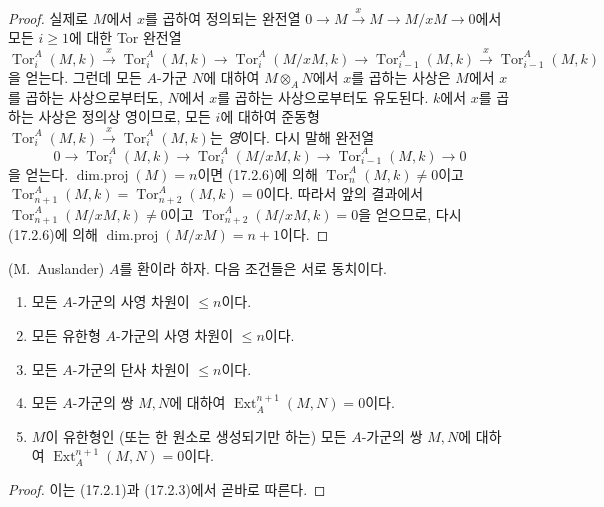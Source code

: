 \begin{proof}
실제로 $M$에서 $x$를 곱하여 정의되는 완전열
$0\longrightarrow M\xrightarrow{x}M\longrightarrow M/xM
\longrightarrow0$에서 모든 $i\geq1$에 대한 Tor 완전열
\[
  \operatorname{Tor}^A_i(M,k)\xrightarrow{x}
  \operatorname{Tor}^A_i(M,k)\longrightarrow
  \operatorname{Tor}^A_i(M/xM,k)\longrightarrow
  \operatorname{Tor}^A_{i-1}(M,k)\xrightarrow{x}
  \operatorname{Tor}^A_{i-1}(M,k)
\]
을 얻는다. 그런데 모든 $A$-가군 $N$에 대하여 $M\otimes_A N$에서
$x$를 곱하는 사상은 $M$에서 $x$를 곱하는 사상으로부터도, $N$에서
$x$를 곱하는 사상으로부터도 유도된다. $k$에서 $x$를 곱하는 사상은
정의상 영이므로, 모든 $i$에 대하여 준동형
$\operatorname{Tor}^A_i(M,k)\xrightarrow{x}
\operatorname{Tor}^A_i(M,k)$는 \emph{영}이다. 다시 말해 완전열
\[
  0\longrightarrow\operatorname{Tor}^A_i(M,k)\longrightarrow
  \operatorname{Tor}^A_i(M/xM,k)\longrightarrow
  \operatorname{Tor}^A_{i-1}(M,k)\longrightarrow0
\]
을 얻는다. $\operatorname{dim.proj}(M)=n$이면 (17.2.6)에 의해
$\operatorname{Tor}^A_n(M,k)\neq0$이고
$\operatorname{Tor}^A_{n+1}(M,k)=
\operatorname{Tor}^A_{n+2}(M,k)=0$이다. 따라서 앞의 결과에서
$\operatorname{Tor}^A_{n+1}(M/xM,k)\neq0$이고
$\operatorname{Tor}^A_{n+2}(M/xM,k)=0$을 얻으므로, 다시 (17.2.6)에
의해 $\operatorname{dim.proj}(M/xM)=n+1$이다.
\end{proof}

\begin{proposition}[17.2.8]
\label{0.17.2.8-fr}
\textnormal{(M.~Auslander)} $A$를 환이라 하자. 다음 조건들은 서로
동치이다.
\begin{enumerate}
  \item[\rm a)] 모든 $A$-가군의 사영 차원이 $\leq n$이다.
  \item[\rm a')] 모든 유한형 $A$-가군의 사영 차원이 $\leq n$이다.
  \item[\rm b)] 모든 $A$-가군의 단사 차원이 $\leq n$이다.
  \item[\rm c)] 모든 $A$-가군의 쌍 $M,N$에 대하여
  $\operatorname{Ext}^{n+1}_A(M,N)=0$이다.
  \item[\rm c')] $M$이 유한형인 (또는 한 원소로 생성되기만 하는)
  모든 $A$-가군의 쌍 $M,N$에 대하여
  $\operatorname{Ext}^{n+1}_A(M,N)=0$이다.
\end{enumerate}
\end{proposition}

\begin{proof}
이는 (17.2.1)과 (17.2.3)에서 곧바로 따른다.
\end{proof}

